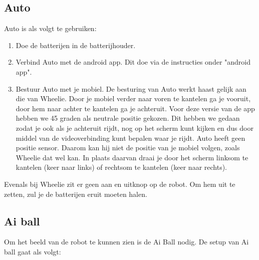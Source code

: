 \documentclass[12pt,a4paper]{article}
\begin{document}
\subsection{Auto}
Auto is als volgt te gebruiken:

\begin{enumerate}
	\item Doe de batterijen in de batterijhouder.
	\item Verbind Auto met de android app. 
	Dit doe via de instructies onder "android app".  
	\item Bestuur Auto met je mobiel. 
	De besturing van Auto werkt haast gelijk aan die van Wheelie. Door je mobiel verder naar voren te kantelen ga je vooruit, door hem naar achter te kantelen ga je achteruit. Voor deze versie van de app hebben we 45 graden als neutrale positie gekozen. Dit hebben we gedaan zodat je ook als je achteruit rijdt, nog op het scherm kunt kijken en dus door middel van de videoverbinding kunt bepalen waar je rijdt. Auto heeft geen positie sensor. Daarom kan hij niet de positie van je mobiel volgen, zoals Wheelie dat wel kan. In plaats daarvan draai je door het scherm linksom te kantelen (keer naar links) of rechtsom te kantelen (keer naar rechts).
\end{enumerate}

Evenals bij Wheelie zit er geen aan en uitknop op de robot. Om hem uit te zetten, zul je de batterijen eruit moeten halen.

\subsection{Ai ball}
Om het beeld van de robot te kunnen zien is de Ai Ball nodig. De setup van Ai ball gaat als volgt: 
\end{document}
